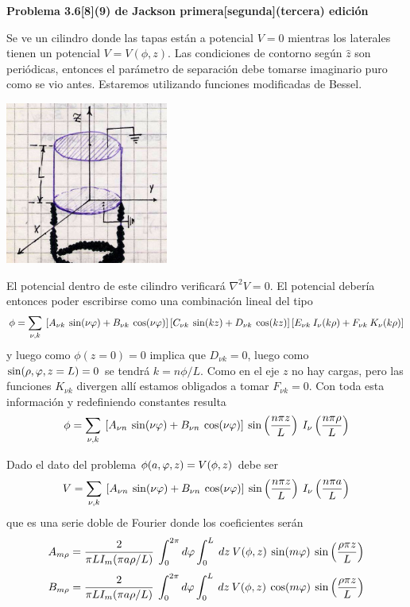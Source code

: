 \documentclass[10pt,oneside]{CBFT_book}
\begin{document}
\begin{ejemplo}{\bf Problema 3.6[8](9) de Jackson primera[segunda](tercera) edición}

Se ve un cilindro donde las tapas están a potencial $V=0 $ mientras los laterales
tienen un potencial $V=V(\phi,z)$.
Las condiciones de contorno según $\hat{z}$ son periódicas, entonces el parámetro
de separación debe tomarse imaginario puro como se vio antes. Estaremos utilizando
funciones modificadas de Bessel.
 
\includegraphics[width=0.4\textwidth]{images/fig_ft1_sep_cilin_A.jpg} 
 
El potencial dentro de este cilindro verificará $\nabla^2 V = 0$.
El potencial debería entonces poder escribirse como una combinación lineal del tipo
\[
	\phi = \sum_{\nu,k} \:
	\left[ A_{\nu k}\:\sin(\nu\varphi) + B_{\nu k}\:\cos(\nu\varphi) \right] 
	\left[ C_{\nu k}\:\sin(kz) +  D_{\nu k}\:\cos(kz) \right]
	\left[ E_{\nu k}\:I_{\nu}(k\rho) +  F_{\nu k}\:K_{\nu}(k\rho)  \right]
\]
y luego como $\phi(z=0) = 0$ implica que $D_{\nu k}=0$, luego como $\sin(\rho,\varphi,z=L)=0$
se tendrá $k = n \phi / L$. Como en el eje $z$ no hay cargas, pero las funciones $K_{\nu k}$
divergen allí estamos obligados a tomar $F_{\nu k}=0$.
Con toda esta información y redefiniendo constantes resulta
\[
	\phi = \sum_{\nu,k} \:
	\left[ A_{\nu n}\:\sin(\nu\varphi) + B_{\nu n}\:\cos(\nu\varphi) \right] 
	\: \sin\left( \frac{n\pi z}{L} \right)  \: I_{\nu}\left(\frac{n\pi \rho}{L}\right) 
\]

Dado el dato del problema $\phi(a,\varphi,z) = V(\phi,z)$ debe ser
\[
	V = \sum_{\nu,k} \:
	\left[ A_{\nu n}\:\sin(\nu\varphi) + B_{\nu n}\:\cos(\nu\varphi) \right] 
	\: \sin\left( \frac{n\pi z}{L} \right)  \: I_{\nu}\left(\frac{n\pi a}{L}\right) 
\]
que es una serie doble de Fourier donde los coeficientes serán
\[
	A_{m\rho} = \frac{2}{\pi L I_m(\pi a \rho/L )} \: 
	\int_0^{2\pi} d\varphi \int_0^L \: dz \: V(\phi,z) \: \sin(m\varphi) \: \sin\left( \frac{\rho \pi z}{L}\right)
\]
\[	
	B_{m\rho} = \frac{2}{\pi L I_m(\pi a \rho/L )} \: 
	\int_0^{2\pi} d\varphi \int_0^L \: dz \: V(\phi,z) \: \cos(m\varphi) \: \sin\left( \frac{\rho \pi z}{L}\right)
\]
 
\end{ejemplo}
\end{document}
